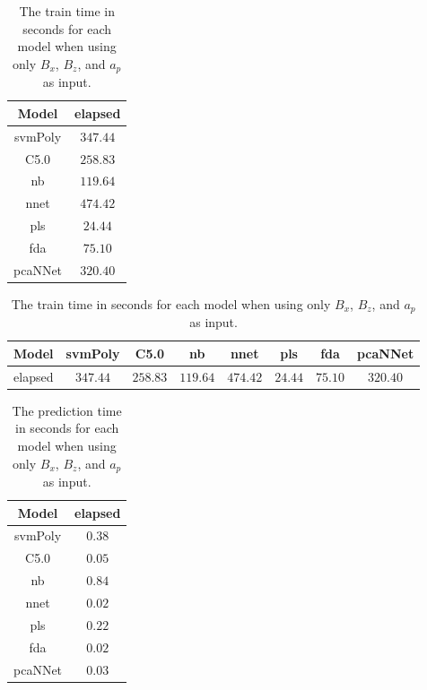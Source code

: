 \begin{table}[!ht]
	\centering
	\begin{tabular}{|c|c|}
		\hline
		Model & elapsed \\ \hline
		svmPoly & $347.44$ \\ \hline
		C5.0 & $258.83$ \\ \hline
		nb & $119.64$ \\ \hline
		nnet & $474.42$ \\ \hline
		pls & $24.44$ \\ \hline
		fda & $75.10$ \\ \hline
		pcaNNet & $320.40$ \\ \hline
	\end{tabular}
	\caption{The train time in seconds for each model when using only $B_{x}$, $B_{z}$, and $a_{p}$ as input.}
	\label{tab:time:xzap:train}
\end{table}

\begin{table}[!ht]
	\centering
	\begin{tabular}{|c|c|c|c|c|c|c|c|}
		\hline
		Model & svmPoly & C5.0 & nb & nnet & pls & fda & pcaNNet \\ \hline
		elapsed & $347.44$ & $258.83$ & $119.64$ & $474.42$ & $24.44$ & $75.10$ & $320.40$ \\ \hline
	\end{tabular}
	\caption{The train time in seconds for each model when using only $B_{x}$, $B_{z}$, and $a_{p}$ as input.}
	\label{tab:time:reverse:xzap:train}
\end{table}

\begin{table}[!ht]
	\centering
	\begin{tabular}{|c|c|}
		\hline
		Model & elapsed \\ \hline
		svmPoly & $0.38$ \\ \hline
		C5.0 & $0.05$ \\ \hline
		nb & $0.84$ \\ \hline
		nnet & $0.02$ \\ \hline
		pls & $0.22$ \\ \hline
		fda & $0.02$ \\ \hline
		pcaNNet & $0.03$ \\ \hline
	\end{tabular}
	\caption{The prediction time in seconds for each model when using only $B_{x}$, $B_{z}$, and $a_{p}$ as input.}
	\label{tab:time:xzap:predict}
\end{table}

